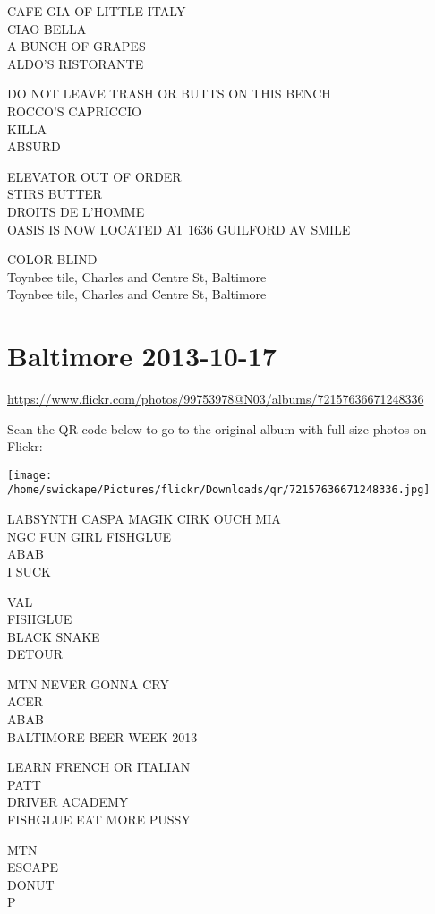 \documentclass[10pt,letterpaper]{article}
\begin{document}
CAFE GIA OF LITTLE ITALY\\
CIAO BELLA\\
A BUNCH OF GRAPES\\
ALDO'S RISTORANTE

DO NOT LEAVE TRASH OR BUTTS ON THIS BENCH\\
ROCCO'S CAPRICCIO\\
KILLA\\
ABSURD

ELEVATOR OUT OF ORDER\\
STIRS BUTTER\\
DROITS DE L'HOMME\\
OASIS IS NOW LOCATED AT 1636 GUILFORD AV SMILE

COLOR BLIND\\
Toynbee tile, Charles and Centre St, Baltimore\\
Toynbee tile, Charles and Centre St, Baltimore


\section*{Baltimore 2013-10-17}

\url{https://www.flickr.com/photos/99753978@N03/albums/72157636671248336}

Scan the QR code below to go to the original album with full-size photos on Flickr:

\texttt{[image: /home/swickape/Pictures/flickr/Downloads/qr/72157636671248336.jpg]}


LABSYNTH CASPA MAGIK CIRK OUCH MIA\\
NGC FUN GIRL FISHGLUE\\
ABAB\\
I SUCK

VAL\\
FISHGLUE\\
BLACK SNAKE\\
DETOUR

MTN NEVER GONNA CRY\\
ACER\\
ABAB\\
BALTIMORE BEER WEEK 2013

LEARN FRENCH OR ITALIAN\\
PATT\\
DRIVER ACADEMY\\
FISHGLUE EAT MORE PUSSY

MTN\\
ESCAPE\\
DONUT\\
P
\end{document}
